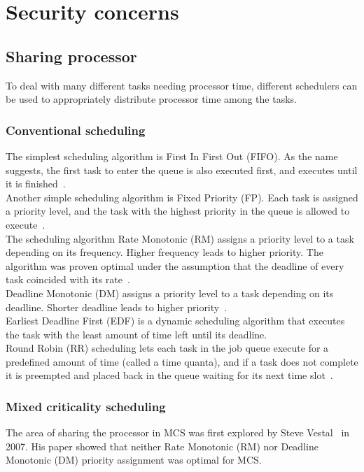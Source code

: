 \section{Security concerns}

\subsection{Sharing processor}
To deal with many different tasks needing processor time, different schedulers can be used to appropriately distribute processor time among the tasks.

\subsubsection{Conventional scheduling}
The simplest scheduling algorithm is First In First Out (FIFO). As the name suggests, the first task to enter the queue is also executed first, and executes until it is finished~\cite{remzi2015}.\\

Another simple scheduling algorithm is Fixed Priority (FP). Each task is assigned a priority level, and the task with the highest priority in the queue is allowed to execute~\cite{liulayland1973}.\\

The scheduling algorithm Rate Monotonic (RM) assigns a priority level to a task depending on its frequency. Higher frequency leads to higher priority. The algorithm was proven optimal under the assumption that the deadline of every task coincided with its rate~\cite{liulayland1973}.\\

Deadline Monotonic (DM) assigns a priority level to a task depending on its deadline. Shorter deadline leads to higher priority~\cite{liulayland1973}.\\

Earliest Deadline First (EDF) is a dynamic scheduling algorithm that executes the task with the least amount of time left until its deadline.\\

Round Robin (RR) scheduling lets each task in the job queue execute for a predefined amount of time (called a time quanta), and if a task does not complete it is preempted and placed back in the queue waiting for its next time slot~\cite{kleinrock1964}.

\subsubsection{Mixed criticality scheduling}
The area of sharing the processor in MCS was first explored by Steve Vestal~\cite{vestal2007} in 2007. His paper showed that neither Rate Monotonic (RM) nor Deadline Monotonic (DM) priority assignment was optimal for MCS.%

